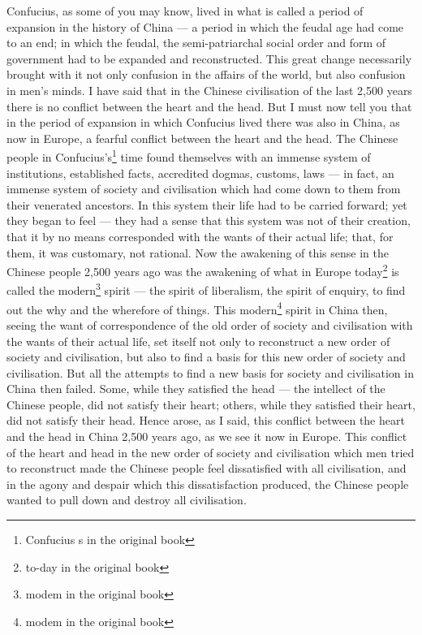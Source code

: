 Confucius, as some of you may know, lived in what is called a period of expansion in the history of China --- a period in which the feudal age had come to an end; in which the feudal, the semi-patriarchal social order and form of government had to be expanded and reconstructed.
This great change necessarily brought with it not only confusion in the affairs of the world, but also confusion in men's minds.
I have said that in the Chinese civilisation of the last 2,500 years there is no conflict between the heart and the head.
But I must now tell you that in the period of expansion in which Confucius lived there was also in China, as now in Europe, a fearful conflict between the heart and the head. The Chinese people in Confucius's\footnote{Confucius s in the original book} time found themselves with an immense system of institutions, established facts, accredited dogmas, customs, laws --- in fact, an immense system of society and civilisation which had come down to them from their venerated ancestors. In this system their life had to be carried forward; yet they began to feel --- they had a sense that this system was not of their creation, that it by no means corresponded with the wants of their actual life; that, for them, it was customary, not rational.
Now the awakening of this sense in the Chinese people 2,500 years ago was the awakening of what in Europe today\footnote{to-day in the original book} is called the modern\footnote{modem in the original book} spirit --- the spirit of liberalism, the spirit of enquiry, to find out the why and the wherefore of things.
This modern\footnote{modem in the original book} spirit in China then, seeing the want of correspondence of the old order of society and civilisation with the wants of their actual life, set itself not only to reconstruct a new order of society and civilisation, but also to find a basis for this new order of society and civilisation.
But all the attempts to find a new basis for society and civilisation in China then failed. Some, while they satisfied the head --- the intellect of the Chinese people, did not satisfy their heart; others, while they satisfied their heart, did not satisfy their head. Hence arose, as I said, this conflict between the heart and the head in China 2,500 years ago, as we see it now in Europe.
This conflict of the heart and head in the new order of society and civilisation which men tried to reconstruct made the Chinese people feel dissatisfied with all civilisation, and in the agony and despair which this dissatisfaction produced, the Chinese people wanted to pull down and destroy all civilisation.
